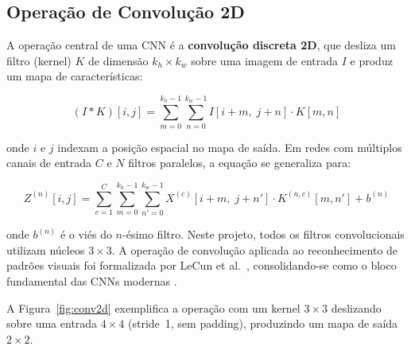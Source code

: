 \documentclass[12pt,a4paper]{article}
\begin{document}
\subsection{Operação de Convolução 2D}

A operação central de uma CNN é a \textbf{convolução discreta 2D}, que desliza um filtro
(kernel) $K$ de dimensão $k_h \times k_w$ sobre uma imagem de entrada $I$ e produz um
mapa de características:

\begin{equation}
  (I * K)[i,j] = \sum_{m=0}^{k_h-1}\sum_{n=0}^{k_w-1} I[i+m,\;j+n]\cdot K[m,n]
  \label{eq:conv2d}
\end{equation}

onde $i$ e $j$ indexam a posição espacial no mapa de saída. Em redes com múltiplos
canais de entrada $C$ e $N$ filtros paralelos, a equação se generaliza para:

\begin{equation}
  Z^{(n)}[i,j]
  = \sum_{c=1}^{C}\sum_{m=0}^{k_h-1}\sum_{n'=0}^{k_w-1}
    X^{(c)}[i+m,\;j+n']\cdot K^{(n,c)}[m,n'] + b^{(n)}
  \label{eq:conv2d_multi}
\end{equation}

onde $b^{(n)}$ é o viés do $n$-ésimo filtro. Neste projeto, todos os filtros
convolucionais utilizam núcleos $3\times3$. A operação de convolução aplicada
ao reconhecimento de padrões visuais foi formalizada por LeCun et al.\
\cite{lecun1998gradient}, consolidando-se como o bloco fundamental das CNNs
modernas \cite{goodfellow2016deep}.

A Figura~\ref{fig:conv2d} exemplifica a operação com um kernel $3\times3$
deslizando sobre uma entrada $4\times4$ (stride~1, sem padding), produzindo
um mapa de saída $2\times2$.
\end{document}

